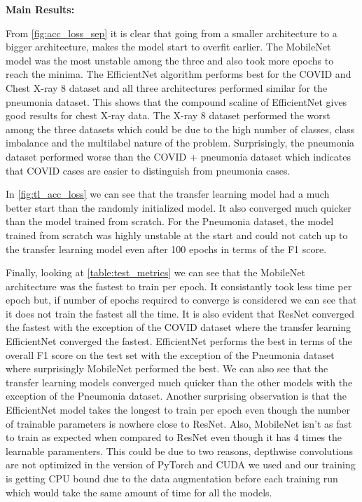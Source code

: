 \documentclass[10pt,twocolumn,letterpaper]{article}
\begin{document}
\textbf{Main Results:}

From \cref{fig:acc_loss_sep} it is clear that going from a smaller 
architecture to a bigger architecture, makes the model start to overfit earlier. 
The MobileNet model was the most unstable among the three and also took more epochs to reach 
the minima. The EfficientNet algorithm performs best for the COVID and Chest X-ray 8 
dataset and all three architectures performed similar for the pneumonia dataset. 
This shows that the compound scaline of EfficientNet gives good results for chest X-ray data.
The X-ray 8 dataset performed the worst among the three datasets which could be due to the 
high number of classes, class imbalance and the multilabel nature of the problem. 
Surprisingly, the pneumonia dataset performed worse than the COVID + pneumonia dataset 
which indicates that COVID cases are easier to distinguish from pneumonia cases. 

In \cref{fig:tl_acc_loss} we can see that the transfer learning model had a much better start than 
the randomly initialized model. It also converged much quicker than the model trained from scratch.
For the Pneumonia dataset, the model trained from scratch was highly unstable at the start 
and could not catch up to the transfer learning model even after 100 epochs in terms of the F1 score.

Finally, looking at \cref{table:test_metrics} we can see that the MobileNet architecture was 
the fastest to train per epoch. It consistantly took less time per epoch but, if number of 
epochs required to converge is considered we can see that it does not train the fastest all the time.
It is also evident that ResNet converged the fastest with the exception of the COVID dataset where the 
transfer learning EfficientNet converged the fastest. EfficientNet performs the best in terms of the 
overall F1 score on the test set with the exception of the Pneumonia dataset where surprisingly 
MobileNet performed the best. We can also see that the transfer learning models converged much quicker 
than the other models with the exception of the Pneumonia dataset. Another surprising observation 
is that the EfficientNet model takes the longest to train per epoch even though the number of trainable 
parameters is nowhere close to ResNet. Also, MobileNet isn't as fast to train as expected when 
compared to ResNet even though it has 4 times the learnable paramenters. This could be due to two 
reasons, depthwise convolutions are not optimized in the version of PyTorch and CUDA we used and 
our training is getting CPU bound due to the data augmentation before each training run which 
would take the same amount of time for all the models. 
\end{document}
